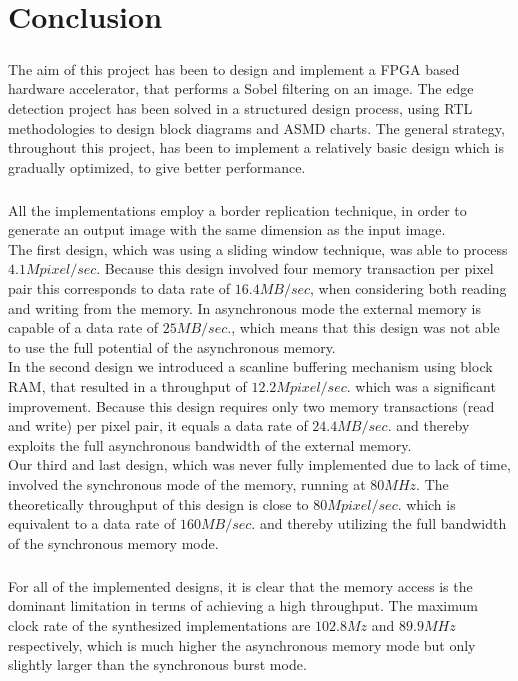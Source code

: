 \chapter{Conclusion}
\paragraph*{ }
The aim of this project has been to design and implement a FPGA based hardware accelerator, that performs a Sobel filtering on an image.
The edge detection project has been solved in a structured design process, using RTL methodologies to design block diagrams and  ASMD charts. The general strategy, throughout this project, has been to implement a relatively basic design which is gradually  optimized, to give better performance.
\paragraph*{ }
All the implementations employ a border replication technique, in order to generate an output image with the same dimension as the input image.\\
The first design, which was using a sliding window technique, was able to process $4.1M pixel/sec.$ Because this design involved four memory transaction per pixel pair this corresponds to data rate of $16.4MB/sec$, when considering both reading and writing from the memory. In asynchronous mode the external memory is capable of a data rate of $25MB/sec.$, which means that this design was not able to use the full potential of the asynchronous memory.\\
In the second design we introduced a scanline buffering mechanism using block RAM, that resulted in a throughput of $12.2M pixel/sec.$ which was a significant improvement. Because this design requires only two memory transactions (read and write) per pixel pair, it equals a data rate of $24.4MB/sec.$ and thereby exploits the full asynchronous bandwidth of the external memory. \\
Our third and last design, which was never fully implemented due to lack of time, involved the synchronous mode of the memory, running at $80MHz$. The theoretically throughput of this design is close to $80M pixel/sec.$ which is equivalent to a data rate of $160MB/sec.$ and thereby utilizing the full bandwidth of the synchronous memory mode.
\paragraph*{ }
For all of the implemented designs, it is clear that the memory access is the dominant limitation in terms of achieving a high throughput. The maximum clock rate of the synthesized implementations are $102.8Mz$ and $89.9MHz$ respectively, which is much higher the asynchronous memory mode but only slightly larger than the synchronous burst mode.



\newpage